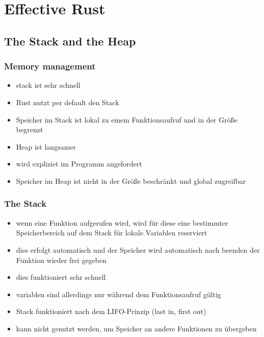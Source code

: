 \documentclass[a4paper,12pt]{article}
\begin{document}
\tableofcontents
\newpage

\setcounter{section}{3} 
\section{Effective Rust}
\subsection{The Stack and the Heap}
\subsubsection*{Memory management}
	\begin{itemize}
	  \item stack ist sehr schnell
	  \item Rust nutzt per default den Stack
	  \item Speicher im Stack ist lokal zu einem Funktionsaufruf und in der Größe begrenzt
	  \item Heap ist langsamer
	  \item wird expliziet im Programm angefordert
	  \item Speicher im Heap ist nicht in der Größe beschränkt und global zugreifbar
	\end{itemize}

\subsubsection*{The Stack}
\begin{itemize}
  \item wenn eine Funktion aufgerufen wird, wird für diese eine bestimmter Speicherbereich auf dem Stack für lokale Variablen reserviert
  \item dies erfolgt automatisch und der Speicher wird automatisch nach beenden der Funktion wieder frei gegeben 
  \item dies funktioniert sehr schnell
  \item variablen sind allerdings nur während dem Funktionsaufruf gültig
  \item Stack funktioniert nach dem LIFO-Prinzip (last in, first out) 
  \item kann nicht genutzt werden, um Speicher an andere Funktionen zu übergeben 
\end{itemize}
\end{document}
